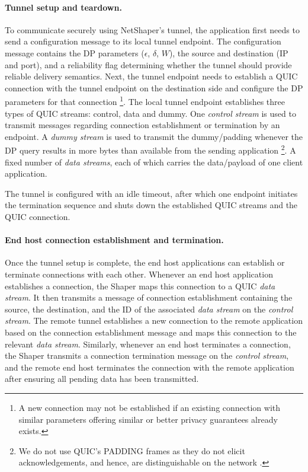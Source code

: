\paragraph{Tunnel setup and teardown.}
To communicate securely using NetShaper's tunnel, the application first needs to send a configuration message to its local tunnel endpoint.
The configuration message contains the DP parameters ($\epsilon$, $\delta$, $W$), the source and destination (IP and port), and a reliability flag determining whether the tunnel should provide reliable delivery semantics.
Next, the tunnel endpoint needs to establish a QUIC connection with the tunnel endpoint on the destination side and configure the DP parameters for that connection
\footnote{A new connection may not be established if an existing connection with similar parameters offering similar or better privacy guarantees already exists.}.
The local tunnel endpoint establishes three types of QUIC streams: control, data and dummy.
One \textit{control stream} is used to transmit messages regarding connection establishment or termination by an endpoint.
A \textit{dummy stream} is used to transmit the dummy/padding whenever the DP query results in more bytes than available from the sending application
\footnote{We do not use QUIC's PADDING frames as they do not elicit acknowledgements, and hence, are distinguishable on the network \cite{quic_rfc}.}.
A fixed number of \textit{data streams}, each of which carries the data/payload of one client application.

The tunnel is configured with an idle timeout, after which one endpoint initiates the termination sequence and shuts down the established QUIC streams and the QUIC connection.

\paragraph{End host connection establishment and termination.}
Once the tunnel setup is complete, the end host applications can establish or terminate connections with each other.
Whenever an end host application establishes a connection, the Shaper maps this connection to a QUIC \textit{data stream}.
It then transmits a message of connection establishment containing the source, the destination, and the ID of the associated \textit{data stream} on the \textit{control stream}.
The remote tunnel establishes a new connection to the remote application based on the connection establishment message and maps this connection to the relevant \textit{data stream}.
Similarly, whenever an end host terminates a connection, the Shaper transmits a connection termination message on the \textit{control stream}, and the remote end host terminates the connection with the remote application after ensuring all pending data has been transmitted.

